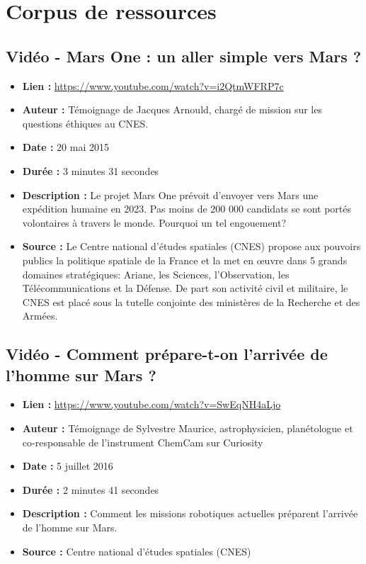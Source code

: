 \documentclass[8pt]{article}
\begin{document}
\newpage

\section{Corpus de ressources}

\subsection{Vidéo - Mars One : un aller simple vers Mars ?}
\begin{itemize}
	\item \textbf{Lien : }  \url{https://www.youtube.com/watch?v=i2QtmWFRP7c} 
	\item \textbf{Auteur : } Témoignage de Jacques Arnould, chargé de mission sur les questions éthiques au CNES.
	\item \textbf{Date : } 20 mai 2015
	\item \textbf{Durée : } 3 minutes 31 secondes
	\item \textbf{Description : } Le projet Mars One prévoit d'envoyer vers Mars une expédition humaine en 2023. Pas moins de 200 000 candidats se sont portés volontaires à travers le monde. Pourquoi un tel engouement? 
	\item \textbf{Source : } Le Centre national d'études spatiales (CNES) propose aux pouvoirs publics la politique spatiale de la France et la met en œuvre dans 5 grands domaines stratégiques: Ariane, les Sciences, l’Observation, les Télécommunications et la Défense. De part son activité civil et militaire, le CNES est placé sous la tutelle conjointe des ministères de la Recherche et des Armées.
	 
\end{itemize}

\subsection{Vidéo - Comment prépare-t-on l'arrivée de l'homme sur Mars ?}
\begin{itemize}
	\item \textbf{Lien : }  \url{https://www.youtube.com/watch?v=SwEqNH4aLjo} 
	\item \textbf{Auteur : } Témoignage de Sylvestre Maurice, astrophysicien, planétologue et co-responsable de l'instrument ChemCam sur Curiosity
	\item \textbf{Date : } 5 juillet 2016
	\item \textbf{Durée : } 2 minutes 41 secondes
	\item \textbf{Description : } Comment les missions robotiques actuelles préparent l'arrivée de l'homme sur Mars.
	\item \textbf{Source : } Centre national d'études spatiales (CNES)
\end{itemize}
\end{document}
